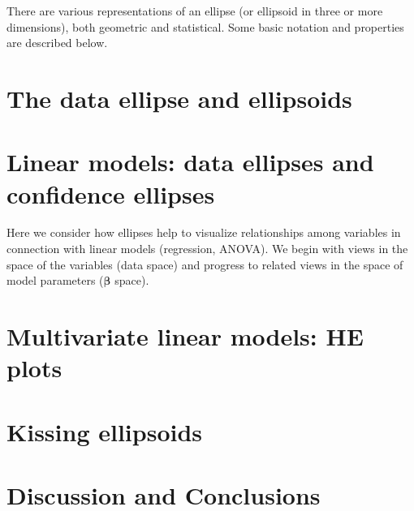 \documentclass[11pt]{article}%
\renewcommand*{\vec}[1]{\ensuremath{\bm{#1}}}     %
\begin{document}
There are various representations of an ellipse (or ellipsoid in three or more dimensions),
both geometric and statistical. Some basic notation and properties are described below.



%
%

\section{The data ellipse and ellipsoids}\label{sec:data-ellipse}



\section{Linear models: data ellipses and confidence ellipses}\label{sec:lm}

Here we consider how ellipses help to visualize relationships among variables
in connection with linear models (regression, ANOVA).
We begin with views in the space of the variables (data space)
and progress to related views in the space of model parameters
($\vec{\beta}$ space).









\section{Multivariate linear models: HE plots}\label{sec:mlm}


\section{Kissing ellipsoids}\label{sec:kiss}









\section{Discussion and Conclusions}

\end{document}
